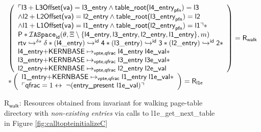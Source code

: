 \begin{figure}\footnotesize
$\begin{array}{l}\left( \begin{array}{l} \ulcorner \textsf{l3}+\textsf{L3Offset(va)} = \textsf{l3\_entry} \land \textsf{table\_root(l4\_entry}_{\textsf{pfn}})  = \textsf{l3} \\ \land \textsf{l2}+\textsf{L2Offset(va)} = \textsf{l2\_entry} \land \textsf{table\_root(l3\_entry}_{\textsf{pfn}})  = \textsf{l2} \\ \land \textsf{l1}+\textsf{L1Offset(va)} = \textsf{l1\_entry} \land \textsf{table\_root(l2\_entry}_{\textsf{pfn}})  = \textsf{l1} \urcorner  \ast \\  \textsf{P} \ast \mathcal{I}\texttt{ASpace}_{\textsf{id}}(\theta,\Xi\setminus\{\textsf{l4\_entry},\textsf{l3\_entry},\textsf{l2\_entry},\textsf{l1\_entry}\},m)  \\ \ghostmaptoken{\delta{}s}{\rtv}{\delta} \ast  
      \ghostmaptoken{\textsf{id}}{(\mathsf{l4\_entry})}{\textsf{4}}\ast \ghostmaptoken{\textsf{id}}{(\mathsf{l3\_entry})}{\textsf{3}} \ast \ghostmaptoken{\textsf{id}}{(\mathsf{l2\_entry})}{\textsf{2}}  \ast \\  \textsf{l4\_entry+KERNBASE} \mapsto_{\textsf{vpte,qfrac}} \textsf{l4\_entry} \; \textsf{l4e\_val}  \ast \\  \textsf{l3\_entry+KERNBASE} \mapsto_{\textsf{vpte,qfrac}} \textsf{l3\_entry}\;\textsf{l3e\_val}  \ast \\  \textsf{l2\_entry+KERNBASE} \mapsto_{\textsf{vpte,qfrac}} \textsf{l2\_entry} \; \textsf{l2e\_val}  \end{array} \right)  =\textsf{R}_{\textsf{walk} } 
    \\ \ast \left(\begin{array}{l}  \textsf{l1\_entry+KERNBASE} \mapsto_{\textsf{vpte,qfrac}} \textsf{l1\_entry}\;\textsf{l1e\_val} \ast \\ \ulcorner  \textsf{qfrac} = 1 \leftrightarrow \; \lnot(\textsf{entry\_present l1e\_val})\urcorner \end{array}\right) =\textsf{R}_{\textsf{l1e}}\end{array} $
\caption{\textsf{R}$_{\textsf{walk}}$: Resources obtained from invariant for walking page-table directory with \emph{non-existing entries} via calls to \textsf{l1e\_get\_next\_table} in Figure \ref{fig:calltopteinitializeC}}
\label{fig:rwalkC}
\vspace{-1em}
\end{figure}
